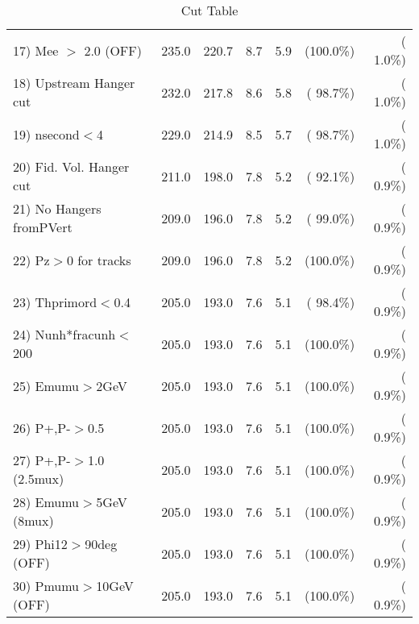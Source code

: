 \begin{table}[h!]
\begin{tabular}{||l||r|r|r|r|r|r||}
 17) Mee $>$ 2.0  (OFF)   &        235.0 &        220.7 &          8.7 &          5.9 & (100.0\%) & (  1.0\%) \\
 18) Upstream Hanger cut  &        232.0 &        217.8 &          8.6 &          5.8 & ( 98.7\%) & (  1.0\%) \\
 19) nsecond$<$4          &        229.0 &        214.9 &          8.5 &          5.7 & ( 98.7\%) & (  1.0\%) \\
 20) Fid. Vol. Hanger cut &        211.0 &        198.0 &          7.8 &          5.2 & ( 92.1\%) & (  0.9\%) \\
 21) No Hangers fromPVert &        209.0 &        196.0 &          7.8 &          5.2 & ( 99.0\%) & (  0.9\%) \\
 22) Pz$>$0 for tracks    &        209.0 &        196.0 &          7.8 &          5.2 & (100.0\%) & (  0.9\%) \\
 23) Thprimord$<$0.4      &        205.0 &        193.0 &          7.6 &          5.1 & ( 98.4\%) & (  0.9\%) \\
 24) Nunh*fracunh$<$200   &        205.0 &        193.0 &          7.6 &          5.1 & (100.0\%) & (  0.9\%) \\
 25) Emumu$>$2GeV         &        205.0 &        193.0 &          7.6 &          5.1 & (100.0\%) & (  0.9\%) \\
 26) P+,P-$>$0.5          &        205.0 &        193.0 &          7.6 &          5.1 & (100.0\%) & (  0.9\%) \\
 27) P+,P-$>$1.0 (2.5mux) &        205.0 &        193.0 &          7.6 &          5.1 & (100.0\%) & (  0.9\%) \\
 28) Emumu$>$5GeV  (8mux) &        205.0 &        193.0 &          7.6 &          5.1 & (100.0\%) & (  0.9\%) \\
 29) Phi12$>$90deg  (OFF) &        205.0 &        193.0 &          7.6 &          5.1 & (100.0\%) & (  0.9\%) \\
 30) Pmumu$>$10GeV  (OFF) &        205.0 &        193.0 &          7.6 &          5.1 & (100.0\%) & (  0.9\%) \\
 \hline
 \hline
 \end{tabular}
 \caption{Cut Table           }
 \label{tab-cutcohjpsi-mumu_cohrho0}
 \end{table}
